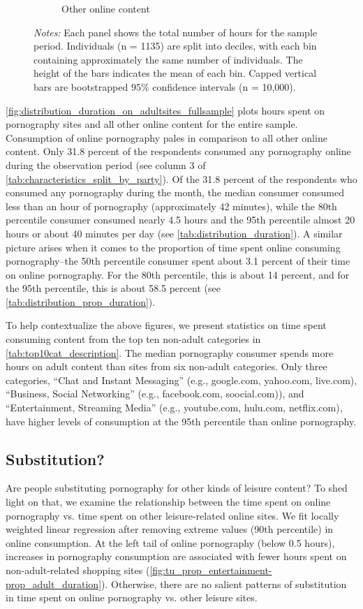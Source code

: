 \documentclass[12pt,twoside]{article}
\begin{document}
\begin{figure}[!ht]
\begin{subfigure}[b]{0.495\textwidth}
         \caption{Other online content}
     \end{subfigure}
\caption*{\footnotesize \emph{Notes:} 
    Each panel shows the total number of hours for the sample period.
    Individuals (n = 1135) are split into deciles, with each bin containing approximately the same number of individuals.
    The height of the bars indicates the mean of each bin. 
    Capped vertical bars are bootstrapped 95\% confidence intervals (n = 10,000).
}
\end{figure}

\cref{fig:distribution_duration_on_adultsites_fullsample} plots hours spent on pornography sites and all other online content for the entire sample. Consumption of online pornography pales in comparison to all other online content. Only 31.8 percent of the respondents consumed any pornography online during the observation period (see column 3 of \cref{tab:characteristics_split_by_party}). Of the 31.8 percent of the respondents who consumed any pornography during the month, the median consumer consumed less than an hour of pornography (approximately 42 minutes), while the 80th percentile consumer consumed nearly 4.5 hours and the 95th percentile almost 20 hours or about 40 minutes per day (see \cref{tab:distribution_duration}). A similar picture arises when it comes to the proportion of time spent online consuming pornography--the 50th percentile consumer spent about 3.1 percent of their time on online pornography. For the 80th percentile, this is about 14 percent, and for the 95th percentile, this is about 58.5 percent (see \cref{tab:distribution_prop_duration}).

To help contextualize the above figures, we present statistics on time spent consuming content from the top ten non-adult categories in \cref{tab:top10cat_description}. The median pornography consumer spends more hours on adult content than sites from six non-adult categories. Only three categories, ``Chat and Instant Messaging'' (e.g., google.com, yahoo.com, live.com), ``Business, Social Networking'' (e.g., facebook.com, soocial.com)),  and ``Entertainment, Streaming Media'' (e.g., youtube.com, hulu.com, netflix.com), have higher levels of consumption at the 95th percentile than online pornography.

\subsection{Substitution?}
Are people substituting pornography for other kinds of leisure content? To shed light on that, we examine the relationship between the time spent on online pornography vs. time spent on other leisure-related online sites. We fit locally weighted linear regression after removing extreme values (90th percentile) in online consumption. At the left tail of online pornography (below 0.5 hours), increases in pornography consumption are associated with fewer hours spent on non-adult-related shopping sites (\cref{fig:tu_prop_entertainment-prop_adult_duration}). Otherwise, there are no salient patterns of substitution in time spent on online pornography vs. other leisure sites.
\end{document}
